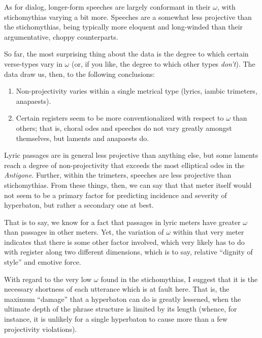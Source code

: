\documentclass{article}
\newcommand{\FN}{\mathsf}
\begin{document}
As for dialog, longer-form speeches are largely conformant in their \ensuremath{\FN{\omega}},
with stichomythias varying a bit more. Speeches are a somewhat less projective
than the stichomythias, being typically more eloquent and long-winded than their
argumentative, choppy counterparts.

So far, the most surprising thing about the data is the degree to which certain
verse-types vary in \ensuremath{\FN{\omega}} (or, if you like, the degree to which other types
\emph{don't}). The data draw us, then, to the following conclusions:

\begin{enumerate}
\item Non-projectivity varies within a single metrical type (lyrics, iambic trimeters,
anapaests).

\item Certain registers seem to be more conventionalized with respect to \ensuremath{\FN{\omega}}
than others; that is, choral odes and speeches do not vary greatly amongst
themselves, but laments and anapaests do.
\end{enumerate}

\noindent
%
Lyric passages are in general less projective than anything else, but some
laments reach a degree of non-projectivity that exceeds the most elliptical odes
in the \emph{Antigone}. Further, within the trimeters, speeches are less projective
than stichomythias. From these things, then, we can say that that meter itself
would not seem to be a primary factor for predicting incidence and severity of
hyperbaton, but rather a secondary one at best.

That is to say, we know for a fact that passages in lyric meters have greater
\ensuremath{\FN{\omega}} than passages in other meters. Yet, the variation of \ensuremath{\FN{\omega}} within that
very meter indicates that there is some other factor involved, which very likely
has to do with register along two different dimensions, which is to say,
relative ``dignity of style'' and emotive force.

With regard to the very low \ensuremath{\FN{\omega}} found in the stichomythias, I suggest that
it is the necessary shortness of each utterance which is at fault here. That is,
the maximum ``damage'' that a hyperbaton can do is greatly lessened, when the
ultimate depth of the phrase structure is limited by its length (whence, for
instance, it is unlikely for a single hyperbaton to cause more than a few
projectivity violations).
\end{document}
